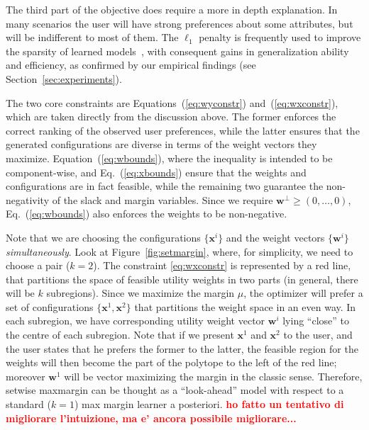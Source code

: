 \documentclass{article}
\renewcommand\[{\begin{equation}}
\renewcommand\]{\end{equation}}
\newcommand{\vecvar}[1]{\ensuremath{\boldsymbol{#1}}}
\newcommand{\vw}{\vecvar{w}}
\newcommand{\vx}{\vecvar{x}}
\newcommand{\stefano}[1]{{\bf \textcolor{green}{{\fbox{Stefano:} #1}}}}
\newcommand{\paolo}[1]{{\bf \textcolor{red}{{\fbox{Paolo:} #1}}}}
\begin{document}
The third part of the objective does require a more in depth explanation. In
many scenarios the user will have strong preferences about some attributes, but
will be indifferent to most of them. %
The $\ell_1$ penalty is frequently
used to improve the sparsity of learned models~\cite{lasso,zhang2008,Hensinger2010}, with consequent gains
in generalization ability and efficiency, as confirmed by our empirical
findings (see Section~\ref{sec:experiments}).

The two core constraints are Equations~(\ref{eq:wyconstr}) and~(\ref{eq:wxconstr}),
which are taken directly from the discussion above. The former enforces the
correct ranking of the observed user preferences, while the latter ensures that
the generated configurations are diverse in terms of the weight vectors they
maximize. Equation~(\ref{eq:wbounds}), where the inequality is intended to be component-wise, and Eq.~(\ref{eq:xbounds})
ensure that the weights and configurations are in fact feasible, while the
remaining two guarantee the non-negativity of the slack and margin variables.
Since we require $\vw^\bot \ge (0,\ldots,0)$, Eq.~(\ref{eq:wbounds}) also enforces the weights to be non-negative.

Note that we are choosing the configurations $\{ \vx^i \}$ and the weight vectors $\{
\vw^i \}$ {\em simultaneously}.
Look at Figure~\ref{fig:setmargin}, where, for simplicity, we need to choose a pair ($k=2$). 
The constraint \ref{eq:wxconstr} is represented by a red line, that partitions the space of
feasible utility weights in two parts (in general, there will be $k$ subregions).
Since we maximize the margin $\mu$, the optimizer
will prefer a set of configurations $\{ \vx^{1}, \vx^{2} \}$ that partitions the weight space
in an even way.
In each subregion, we have corresponding utility weight vector $\vw^{i}$
lying ``close'' to the centre of each subregion. 
Note that if we present $\vx^{1}$ and $\vx^{2}$ to the user, and the user states that he prefers
the former to the latter, the feasible region for the weights will then become the part of the polytope to the left of the red line; moreover $\vw^{1}$ will be vector maximizing the margin in the classic sense.
Therefore, setwise maxmargin can be thought as a ``look-ahead'' model with respect to a standard ($k=1$) max margin learner a posteriori.
\paolo{ho fatto un tentativo di migliorare l'intuizione, ma e' ancora possibile migliorare...}
\end{document}
